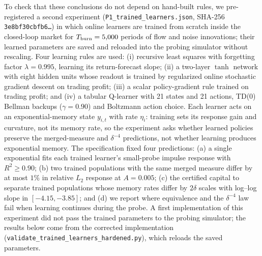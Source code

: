 To check that these conclusions do not depend on hand-built rules, we pre-registered a second experiment (\texttt{P1\_\allowbreak trained\_\allowbreak learners.json}, SHA-256 \texttt{3e8bf30cbfb6\ldots}) in which online learners are trained from scratch inside the closed-loop market for $T_{\rm burn}=5{,}000$ periods of flow and noise innovations; their learned parameters are saved and reloaded into the probing simulator without rescaling. Four learning rules are used: (i) recursive least squares with forgetting factor $\lambda=0.995$, learning its return-forecast slope; (ii) a two-layer $\tanh$ network with eight hidden units whose readout is trained by regularized online stochastic gradient descent on trading profit; (iii) a scalar policy-gradient rule trained on trading profit; and (iv) a tabular Q-learner with 21 states and 21 actions, TD(0) Bellman backups ($\gamma=0.90$) and Boltzmann action choice. Each learner acts on an exponential-memory state $y_{i,t}$ with rate $\eta_i$: training sets its response gain and curvature, not its memory rate, so the experiment asks whether learned policies preserve the merged-measure and $\delta^{-4}$ predictions, not whether learning produces exponential memory. The specification fixed four predictions: (a) a single exponential fits each trained learner's small-probe impulse response with $R^2\ge0.90$; (b) two trained populations with the same merged measure differ by at most $1\%$ in relative $L_2$ response at $A=0.005$; (c) the certified capital to separate trained populations whose memory rates differ by $2\delta$ scales with log--log slope in $[-4.15,-3.85]$; and (d) we report where equivalence and the $\delta^{-4}$ law fail when learning continues during the probe. A first implementation of this experiment did not pass the trained parameters to the probing simulator; the results below come from the corrected implementation (\texttt{validate\_\allowbreak trained\_\allowbreak learners\_\allowbreak hardened.py}), which reloads the saved parameters.

